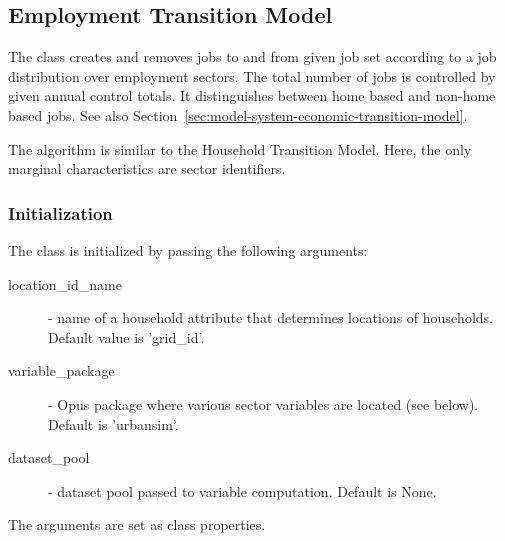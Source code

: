 %
\subsection{Employment Transition Model}
%
\label{sec:employment-transition-model}

The class   creates and removes jobs to and
from given job set according to a job distribution over employment sectors.
The total number of jobs is controlled by given annual control totals. It
distinguishes between home based and non-home based jobs. See also Section~\ref{sec:model-system-economic-transition-model}.

The algorithm is similar to the Household Transition Model.
Here, the only marginal characteristics are sector
identifiers.

\subsubsection{Initialization}
%
The class is initialized by passing the following arguments:
\begin{description}
\item[location_id_name] - name of a household attribute that determines locations of households.
  Default value is 'grid_id'.
\item[variable_package] - Opus package where various sector variables are located (see below). 
  Default is 'urbansim'.
\item[dataset_pool] - dataset pool passed to variable computation. Default is None. 
\end{description}
The arguments are set as class properties.
